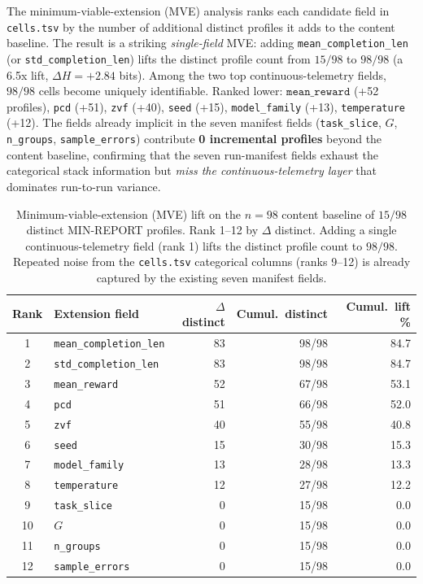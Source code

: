 \documentclass{article}  \usepackage[preprint,nonatbib]{neurips_2026} \usepackage[numbers]{natbib}
\begin{document}
The minimum-viable-extension (MVE) analysis ranks each candidate field
in \texttt{cells.tsv} by the number of additional distinct profiles it
adds to the content baseline. The result is a striking
\emph{single-field} MVE: adding \texttt{mean\_completion\_len} (or
\texttt{std\_completion\_len}) lifts the distinct profile count from
$15/98$ to $98/98$ (a 6.5x lift, $\Delta H = +2.84$ bits). Among the
two top continuous-telemetry fields, $98/98$ cells become uniquely
identifiable. Ranked lower:
$\texttt{mean\_reward}$ (+52 profiles), \texttt{pcd} (+51),
\texttt{zvf} (+40), \texttt{seed} (+15), \texttt{model\_family}
(+13), \texttt{temperature} (+12). The fields already implicit in the
seven manifest fields (\texttt{task\_slice}, $G$, \texttt{n\_groups},
\texttt{sample\_errors}) contribute \textbf{0 incremental profiles}
beyond the content baseline, confirming that the seven run-manifest fields
exhaust the categorical stack information but \emph{miss the
continuous-telemetry layer} that dominates run-to-run variance.

\begin{table}[t]
\centering\small
\caption{Minimum-viable-extension (MVE) lift on the $n{=}98$ content
baseline of $15/98$ distinct MIN-REPORT profiles. Rank 1--12 by
$\Delta$ distinct. Adding a single continuous-telemetry field (rank 1)
lifts the distinct profile count to $98/98$. Repeated noise from the
\texttt{cells.tsv} categorical columns (ranks 9--12) is already
captured by the existing seven manifest fields.}
\label{tab:p5-mve}
\begin{tabular}{@{}clrrr@{}}
\toprule
Rank & Extension field & $\Delta$ distinct & Cumul.\ distinct & Cumul.\ lift \% \\
\midrule
1 & \texttt{mean\_completion\_len} & 83 & 98/98 & 84.7 \\
2 & \texttt{std\_completion\_len}  & 83 & 98/98 & 84.7 \\
3 & \texttt{mean\_reward}         & 52 & 67/98 & 53.1 \\
4 & \texttt{pcd}                  & 51 & 66/98 & 52.0 \\
5 & \texttt{zvf}                  & 40 & 55/98 & 40.8 \\
6 & \texttt{seed}                 & 15 & 30/98 & 15.3 \\
7 & \texttt{model\_family}        & 13 & 28/98 & 13.3 \\
8 & \texttt{temperature}          & 12 & 27/98 & 12.2 \\
9 & \texttt{task\_slice}           &  0 & 15/98 &  0.0 \\
10& $G$                           &  0 & 15/98 &  0.0 \\
11& \texttt{n\_groups}            &  0 & 15/98 &  0.0 \\
12& \texttt{sample\_errors}       &  0 & 15/98 &  0.0 \\
\bottomrule
\end{tabular}
\end{table}
\end{document}
